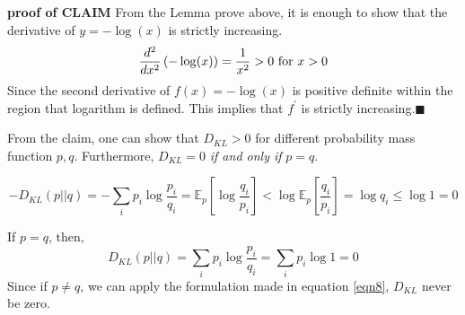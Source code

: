 \documentclass[10pt]{article}
\begin{document}
\textbf{proof of CLAIM}
From the Lemma prove above, it is enough to show that the derivative of $y = -\log(x)$ is strictly increasing. 
\begin{equation}
    {d^2 \over dx^2} \left(-\log(x)\right) = \frac{1}{x^2} >0 \text{ for } x>0
\end{equation}
Since the second derivative of $f(x) = -\log(x)$ is positive definite within the region that logarithm is defined. 
This implies that $f^\prime$ is strictly increasing.$\blacksquare$


From the claim, one can show that $D_{KL}>0$ for different probability mass function $p, q$. Furthermore, $D_{KL}=0$ \textit{if and only if} $p = q$.  

\begin{equation}
    -D_{KL}(p||q) = -\sum_i p_i\log{\frac{p_i}{q_i}} = \mathbb{E}_{p}\left[\log{\frac{q_i}{p_i}}\right] < \log{\mathbb{E}_p\left[\frac{q_i}{p_i}\right]} = \log q_i \le \log 1 = 0 
    \label{eqn8}
\end{equation}

If $p=q$, then, 
\begin{equation}
    D_{KL}(p||q) = \sum_i p_i \log{\frac{p_i}{q_i}} = \sum_i p_i \log{1} = 0
\end{equation}
Since if $p\neq q$, we can apply the formulation made in equation \ref{eqn8}, $D_{KL}$ never be zero. 
\section{}
\section{}
\section{}
\appendix
\end{document}
